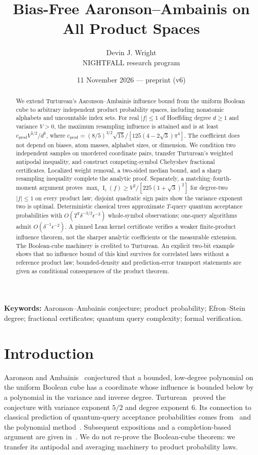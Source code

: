 \documentclass[11pt]{article}
\title{Bias-Free Aaronson--Ambainis on All Product Spaces}
\author{Devin J. Wright\\\small NIGHTFALL research program}
\date{11 November 2026 --- preprint (v6)}
\numberwithin{equation}{section}
\theoremstyle{remark}
\newcommand{\Inf}{\operatorname{I}}
\newcommand{\cprod}{c_{\mathrm{prod}}}
\begin{document}
\maketitle
\begin{abstract}
We extend Turturean's Aaronson--Ambainis influence bound from the uniform Boolean cube to arbitrary independent product probability spaces, including nonatomic alphabets and uncountable index sets. For real $|f|\le1$ of Hoeffding degree $d\ge1$ and variance $V>0$, the maximum resampling influence is attained and is at least $\cprod V^{5/2}/d^6$, where $\cprod=(8/5)^{3/2}\sqrt{15}/[125(4-2\sqrt3)\pi^4]$. The coefficient does not depend on biases, atom masses, alphabet sizes, or dimension. We condition two independent samples on unordered coordinate pairs, transfer Turturean's weighted antipodal inequality, and construct competing-symbol Chebyshev fractional certificates. Localized weight removal, a two-sided median bound, and a sharp resampling inequality complete the analytic proof. Separately, a matching--fourth-moment argument proves $\max_i\Inf_i(f)\ge V^2/[225(1+\sqrt3)^2]$ for degree-two $|f|\le1$ on every product law; disjoint quadratic sign pairs show the variance exponent two is optimal. Deterministic classical trees approximate $T$-query quantum acceptance probabilities with $O(T^7\delta^{-3/2}\epsilon^{-3})$ whole-symbol observations; one-query algorithms admit $O(\delta^{-1}\epsilon^{-2})$. A pinned Lean kernel certificate verifies a weaker finite-product influence theorem, not the sharper analytic coefficients or the measurable extension. The Boolean-cube machinery is credited to Turturean. An explicit two-bit example shows that no influence bound of this kind survives for correlated laws without a reference product law; bounded-density and prediction-error transport statements are given as conditional consequences of the product theorem.
\end{abstract}
\noindent\textbf{Keywords:} Aaronson--Ambainis conjecture; product probability; Efron--Stein degree; fractional certificates; quantum query complexity; formal verification.

\section{Introduction}\label{sec:intro}
Aaronson and Ambainis~\cite[Conjecture~1.7]{AA14} conjectured that a bounded, low-degree polynomial on the uniform Boolean cube has a coordinate whose influence is bounded below by a polynomial in the variance and inverse degree. Turturean~\cite[Theorem~1.1]{Tur26} proved the conjecture with variance exponent $5/2$ and degree exponent $6$. Its connection to classical prediction of quantum-query acceptance probabilities comes from~\cite[Theorem~3.3]{AA14} and the polynomial method~\cite{BBCMW01}. Subsequent expositions and a completion-based argument are given in~\cite{BDST26,HMP26}. We do not re-prove the Boolean-cube theorem: we transfer its antipodal and averaging machinery to product probability laws.
\end{document}

